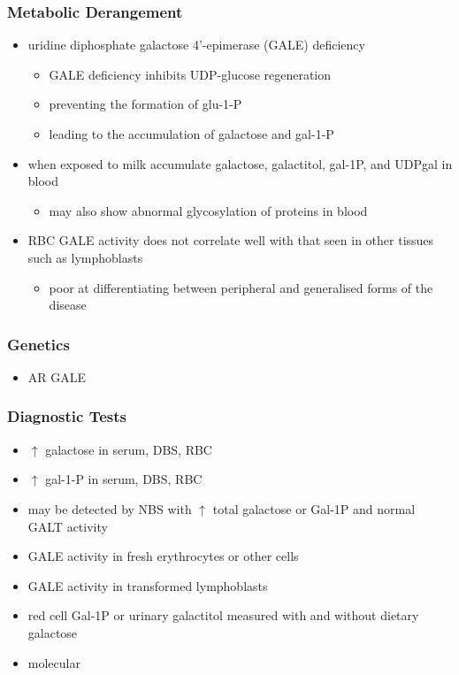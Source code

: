 \documentclass{scrartcl}
\begin{document}
\subsubsection{Metabolic Derangement}
\label{sec:org64265e9}
\begin{itemize}
\item uridine diphosphate galactose 4’-epimerase (GALE) deficiency
\begin{itemize}
\item GALE deficiency inhibits UDP-glucose regeneration
\item preventing the formation of glu-1-P
\item leading to the accumulation of galactose and gal-1-P
\end{itemize}
\item when exposed to milk accumulate galactose, galactitol, gal-1P, and
UDPgal in blood
\begin{itemize}
\item may also show abnormal glycosylation of proteins in blood
\end{itemize}
\item RBC GALE activity does not correlate well with that seen in
other tissues such as lymphoblasts
\begin{itemize}
\item poor at differentiating between peripheral and generalised forms
of the disease
\end{itemize}
\end{itemize}

\subsubsection{Genetics}
\label{sec:orga4234cd}
\begin{itemize}
\item AR GALE
\end{itemize}

\subsubsection{Diagnostic Tests}
\label{sec:org97530ff}
\begin{itemize}
\item \(\uparrow\) galactose in serum, DBS, RBC
\item \(\uparrow\) gal-1-P in serum, DBS, RBC
\item may be detected by NBS with \(\uparrow\) total galactose or Gal-1P and normal GALT activity
\item GALE activity in fresh erythrocytes or other cells
\item GALE activity in transformed lymphoblasts
\item red cell Gal-1P or urinary galactitol measured with and without dietary galactose
\item molecular
\end{itemize}
\end{document}
